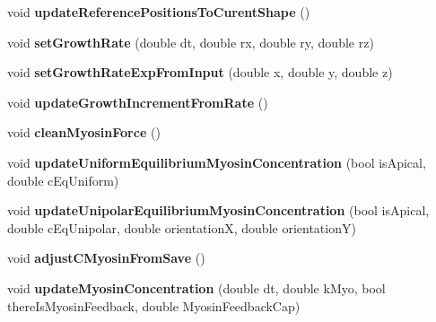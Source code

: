 \begin{DoxyCompactItemize}
\item 
\hypertarget{classShapeBase_a67c28a77c275496eaecc88005e097819}{}void {\bfseries update\+Reference\+Positions\+To\+Curent\+Shape} ()\label{classShapeBase_a67c28a77c275496eaecc88005e097819}

\item 
\hypertarget{classShapeBase_ac06c53088788e3c1461233623f506dbb}{}void {\bfseries set\+Growth\+Rate} (double dt, double rx, double ry, double rz)\label{classShapeBase_ac06c53088788e3c1461233623f506dbb}

\item 
\hypertarget{classShapeBase_ad463361e0b893ceee62a5c65c4c0e0f6}{}void {\bfseries set\+Growth\+Rate\+Exp\+From\+Input} (double x, double y, double z)\label{classShapeBase_ad463361e0b893ceee62a5c65c4c0e0f6}

\item 
\hypertarget{classShapeBase_ad7d7957431a1ae402347efb03ad94d0e}{}void {\bfseries update\+Growth\+Increment\+From\+Rate} ()\label{classShapeBase_ad7d7957431a1ae402347efb03ad94d0e}

\item 
\hypertarget{classShapeBase_aaf8312bb00ea6178abd9ebb1e8f40099}{}void {\bfseries clean\+Myosin\+Force} ()\label{classShapeBase_aaf8312bb00ea6178abd9ebb1e8f40099}

\item 
\hypertarget{classShapeBase_a47ac1da121eea90c265647b6f2115bfe}{}void {\bfseries update\+Uniform\+Equilibrium\+Myosin\+Concentration} (bool is\+Apical, double c\+Eq\+Uniform)\label{classShapeBase_a47ac1da121eea90c265647b6f2115bfe}

\item 
\hypertarget{classShapeBase_a6e4cc22d01118cf2dcb77276b56edf9d}{}void {\bfseries update\+Unipolar\+Equilibrium\+Myosin\+Concentration} (bool is\+Apical, double c\+Eq\+Unipolar, double orientation\+X, double orientation\+Y)\label{classShapeBase_a6e4cc22d01118cf2dcb77276b56edf9d}

\item 
\hypertarget{classShapeBase_ae141d5296b5b4ce7ca59b8c217ef2947}{}void {\bfseries adjust\+C\+Myosin\+From\+Save} ()\label{classShapeBase_ae141d5296b5b4ce7ca59b8c217ef2947}

\item 
\hypertarget{classShapeBase_aa5af6d7dda5ce1f12bf644d06b1f151c}{}void {\bfseries update\+Myosin\+Concentration} (double dt, double k\+Myo, bool there\+Is\+Myosin\+Feedback, double Myosin\+Feedback\+Cap)\label{classShapeBase_aa5af6d7dda5ce1f12bf644d06b1f151c}


\end{DoxyCompactItemize}
